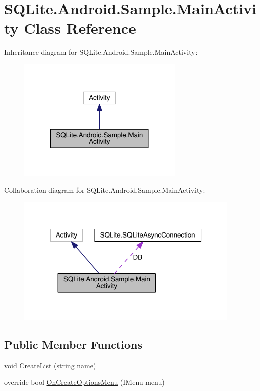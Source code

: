 \hypertarget{class_s_q_lite_1_1_android_1_1_sample_1_1_main_activity}{\section{S\+Q\+Lite.\+Android.\+Sample.\+Main\+Activity Class Reference}
\label{class_s_q_lite_1_1_android_1_1_sample_1_1_main_activity}
}


Inheritance diagram for S\+Q\+Lite.\+Android.\+Sample.\+Main\+Activity\+:
\nopagebreak
\begin{figure}[H]
\begin{center}
\leavevmode
\includegraphics[width=224pt]{class_s_q_lite_1_1_android_1_1_sample_1_1_main_activity__inherit__graph}
\end{center}
\end{figure}


Collaboration diagram for S\+Q\+Lite.\+Android.\+Sample.\+Main\+Activity\+:
\nopagebreak
\begin{figure}[H]
\begin{center}
\leavevmode
\includegraphics[width=302pt]{class_s_q_lite_1_1_android_1_1_sample_1_1_main_activity__coll__graph}
\end{center}
\end{figure}
\subsection*{Public Member Functions}
\begin{DoxyCompactItemize}
\item 
void \hyperlink{class_s_q_lite_1_1_android_1_1_sample_1_1_main_activity_a6a4c4c67bfb8c11c6d3da14fc13e150a}{Create\+List} (string name)
\item 
override bool \hyperlink{class_s_q_lite_1_1_android_1_1_sample_1_1_main_activity_a3daf2237cb8e12ad81b59b8620c53b16}{On\+Create\+Options\+Menu} (I\+Menu menu)
\end{DoxyCompactItemize}
